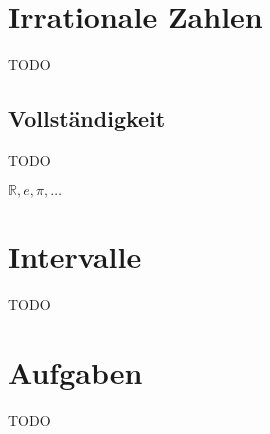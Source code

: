 \section{Irrationale Zahlen}

TODO


\subsection{Vollständigkeit}

TODO

$\mathbb{R}, e, \pi, \dots $

\section{Intervalle}

TODO

\section{Aufgaben}
TODO
